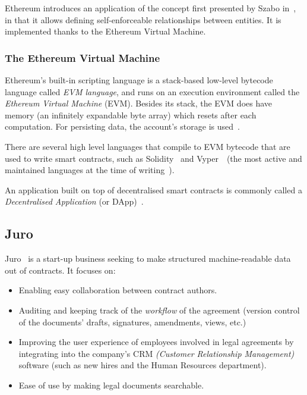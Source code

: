 Ethereum introduces an application of the concept first presented by Szabo in~\cite{szabo1997smart-contracts}, in that it allows defining self-enforceable relationships between entities.
It is implemented thanks to the Ethereum Virtual Machine.

\subsubsection{The Ethereum Virtual Machine}\label{subsubsec:evm}

Ethereum's built-in scripting language is a stack-based low-level bytecode language called
\textit{EVM language}, and runs on an execution environment called the \textit{Ethereum Virtual
Machine} (EVM).
Besides its stack, the EVM does have memory (an infinitely expandable byte array) which resets after
each computation.
For persisting data, the account's storage is used~\cite{buterin2015ethereum}.

There are several high level languages that compile to EVM bytecode that are used to write smart
contracts, such as Solidity~\cite{solidity_repo} and Vyper~\cite{vyper_repo}~(the most active and
maintained languages at the time of writing~\cite{eth_smartContractLangs}).


An application built on top of decentralised smart contracts is commonly called a
\textit{Decentralised Application} (or DApp)~\cite{masteringEthGlossary}.

\subsection{Juro}\label{subsec:juro}
Juro~\cite{juroWhitepaper} is a start-up business seeking to make structured machine-readable data out of contracts.
It focuses on:
\begin{itemize}
    \item Enabling easy collaboration between contract authors.
    \item Auditing and keeping track of the \textit{workflow} of the agreement (version control of the documents'
    drafts, signatures, amendments, views, etc.)
    \item Improving the user experience of employees involved in legal agreements by integrating into the company's CRM
    \textit{(Customer Relationship Management)} software (such as new hires and the Human Resources department).
    \item Ease of use by making legal documents searchable.
\end{itemize}

